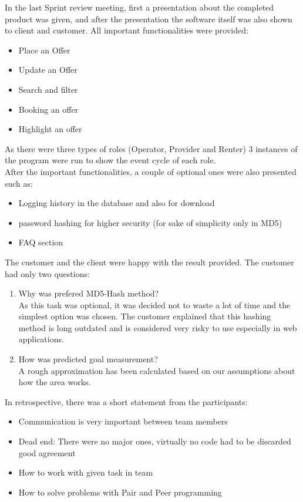 In the last Sprint review meeting, first a presentation about the completed product was given, and after the presentation the software itself was also shown to client and customer. All important functionalities were provided:
\begin{itemize}
    \item Place an Offer
    \item Update an Offer
    \item Search and filter
    \item Booking an offer
    \item Highlight an offer
\end{itemize}


As there were three types of roles (Operator, Provider and Renter) 3 instances of the program were run to show the event cycle of each role.\\

After the important functionalities, a couple of optional ones were also presented such as:
\begin{itemize}
    \item Logging history in the database and also for download
    \item password hashing for higher security (for sake of simplicity only in MD5)
    \item FAQ section
\end{itemize}


The customer and the client were happy with the result provided. The customer had only two questions:

\begin{enumerate}
    \item Why was prefered MD5-Hash method?\\
    As this task was optional, it was decided not to waste a lot of time and the simplest option was chosen. The customer explained that this hashing method is long outdated and is considered very risky to use especially in web applications.
    \item How was predicted goal measurement?\\
    A rough approximation has been calculated based on our assumptions about how the area works.
\end{enumerate}

In retrospective, there was a short statement from the participants: 
\begin{itemize}
    \item Communication is very important between team members
    \item Dead end: There were no major ones, virtually no code had to be discarded 
    good agreement
    \item How to work with given task in team
    \item How to solve problems with Pair and Peer programming
\end{itemize}